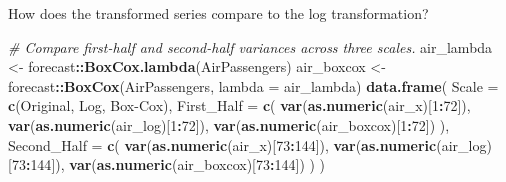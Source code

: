 \documentclass[
  10pt,
]{extarticle}
\newenvironment{Shaded}{\begin{snugshade}}{\end{snugshade}}
\newcommand{\AttributeTok}[1]{\textcolor[rgb]{0.13,0.29,0.53}{#1}}
\newcommand{\CommentTok}[1]{\textcolor[rgb]{0.56,0.35,0.01}{\textit{#1}}}
\newcommand{\DecValTok}[1]{\textcolor[rgb]{0.00,0.00,0.81}{#1}}
\newcommand{\FunctionTok}[1]{\textcolor[rgb]{0.13,0.29,0.53}{\textbf{#1}}}
\newcommand{\NormalTok}[1]{#1}
\newcommand{\OtherTok}[1]{\textcolor[rgb]{0.56,0.35,0.01}{#1}}
\newcommand{\SpecialCharTok}[1]{\textcolor[rgb]{0.81,0.36,0.00}{\textbf{#1}}}
\newcommand{\StringTok}[1]{\textcolor[rgb]{0.31,0.60,0.02}{#1}}
\begin{document}
\begin{problem}[Problem 3 (b)]
How does the transformed series compare to the log transformation?
\end{problem}

\begin{Shaded}
\begin{Highlighting}[]
\CommentTok{\# Compare first{-}half and second{-}half variances across three scales.}
\NormalTok{air\_lambda }\OtherTok{\textless{}{-}}\NormalTok{ forecast}\SpecialCharTok{::}\FunctionTok{BoxCox.lambda}\NormalTok{(AirPassengers)}
\NormalTok{air\_boxcox }\OtherTok{\textless{}{-}}\NormalTok{ forecast}\SpecialCharTok{::}\FunctionTok{BoxCox}\NormalTok{(AirPassengers, }\AttributeTok{lambda =}\NormalTok{ air\_lambda)}
\FunctionTok{data.frame}\NormalTok{(}
  \AttributeTok{Scale =} \FunctionTok{c}\NormalTok{(}\StringTok{\textquotesingle{}Original\textquotesingle{}}\NormalTok{, }\StringTok{\textquotesingle{}Log\textquotesingle{}}\NormalTok{, }\StringTok{\textquotesingle{}Box{-}Cox\textquotesingle{}}\NormalTok{),}
  \AttributeTok{First\_Half =} \FunctionTok{c}\NormalTok{(}
    \FunctionTok{var}\NormalTok{(}\FunctionTok{as.numeric}\NormalTok{(air\_x)[}\DecValTok{1}\SpecialCharTok{:}\DecValTok{72}\NormalTok{]),}
    \FunctionTok{var}\NormalTok{(}\FunctionTok{as.numeric}\NormalTok{(air\_log)[}\DecValTok{1}\SpecialCharTok{:}\DecValTok{72}\NormalTok{]),}
    \FunctionTok{var}\NormalTok{(}\FunctionTok{as.numeric}\NormalTok{(air\_boxcox)[}\DecValTok{1}\SpecialCharTok{:}\DecValTok{72}\NormalTok{])}
\NormalTok{  ),}
  \AttributeTok{Second\_Half =} \FunctionTok{c}\NormalTok{(}
    \FunctionTok{var}\NormalTok{(}\FunctionTok{as.numeric}\NormalTok{(air\_x)[}\DecValTok{73}\SpecialCharTok{:}\DecValTok{144}\NormalTok{]),}
    \FunctionTok{var}\NormalTok{(}\FunctionTok{as.numeric}\NormalTok{(air\_log)[}\DecValTok{73}\SpecialCharTok{:}\DecValTok{144}\NormalTok{]),}
    \FunctionTok{var}\NormalTok{(}\FunctionTok{as.numeric}\NormalTok{(air\_boxcox)[}\DecValTok{73}\SpecialCharTok{:}\DecValTok{144}\NormalTok{])}
\NormalTok{  )}
\NormalTok{)}
\end{Highlighting}
\end{Shaded}
\end{document}

